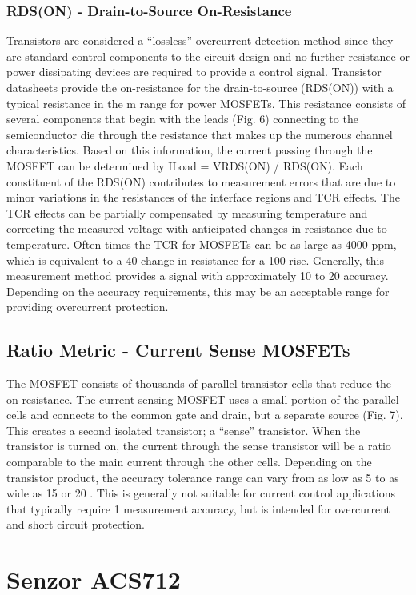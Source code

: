 \documentclass[12pt,a4paper,titlepage,openany]{report}
\begin{document}
\subsubsection{RDS(ON) - Drain-to-Source On-Resistance}
Transistors are considered a “lossless” overcurrent detection method since they are standard control components to the circuit
design and no further resistance or power dissipating devices are required to provide a control signal. Transistor datasheets
provide the on-resistance for the drain-to-source (RDS(ON)) with a typical resistance in the m range for power MOSFETs. This
resistance consists of several components that begin with the leads (Fig. 6) connecting to the semiconductor die through the
resistance that makes up the numerous channel characteristics. Based on this information, the current passing through the
MOSFET can be determined by ILoad = VRDS(ON) / RDS(ON).
Each constituent of the RDS(ON) contributes to measurement errors that are due to minor variations in the resistances of the
interface regions and TCR effects. The TCR effects can be partially compensated by measuring temperature and correcting the
measured voltage with anticipated changes in resistance due to temperature. Often times the TCR for MOSFETs can be as large
as 4000 ppm, which is equivalent to a 40  change in resistance for a 100  rise. Generally, this measurement method
provides a signal with approximately 10  to 20  accuracy. Depending on the accuracy requirements, this may be an
acceptable range for providing overcurrent protection.

\subsection{Ratio Metric - Current Sense MOSFETs}
The MOSFET consists of thousands of parallel transistor cells that reduce the on-resistance. The current sensing MOSFET uses
a small portion of the parallel cells and connects to the common gate and drain, but a separate source (Fig. 7). This creates a
second isolated transistor; a “sense” transistor. When the transistor is turned on, the current through the sense transistor will
be a ratio comparable to the main current through the other cells.
Depending on the transistor product, the accuracy tolerance range can vary from as low as 5  to as wide as 15  or 20 .
This is generally not suitable for current control applications that typically require 1  measurement accuracy, but is intended
for overcurrent and short circuit protection.

\section{Senzor ACS712}
\end{document}
